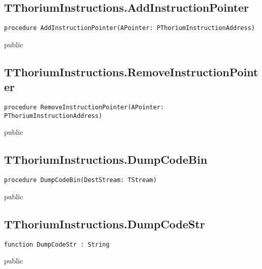 \subsection{TThoriumInstructions.AddInstructionPointer}
\label{thoriumcorepkg:thorium:tthoriuminstructions:addinstructionpointer}
\begin{FPCList}
\Declaration 

\begin{verbatim}
procedure AddInstructionPointer(APointer: PThoriumInstructionAddress)
\end{verbatim}
\Visibility
public
\end{FPCList}
\subsection{TThoriumInstructions.RemoveInstructionPointer}
\label{thoriumcorepkg:thorium:tthoriuminstructions:removeinstructionpointer}
\begin{FPCList}
\Declaration 

\begin{verbatim}
procedure RemoveInstructionPointer(APointer: PThoriumInstructionAddress)
\end{verbatim}
\Visibility
public
\end{FPCList}
\subsection{TThoriumInstructions.DumpCodeBin}
\label{thoriumcorepkg:thorium:tthoriuminstructions:dumpcodebin}
\begin{FPCList}
\Declaration 

\begin{verbatim}
procedure DumpCodeBin(DestStream: TStream)
\end{verbatim}
\Visibility
public
\end{FPCList}
\subsection{TThoriumInstructions.DumpCodeStr}
\label{thoriumcorepkg:thorium:tthoriuminstructions:dumpcodestr}
\begin{FPCList}
\Declaration 

\begin{verbatim}
function DumpCodeStr : String
\end{verbatim}
\Visibility
public
\end{FPCList}
